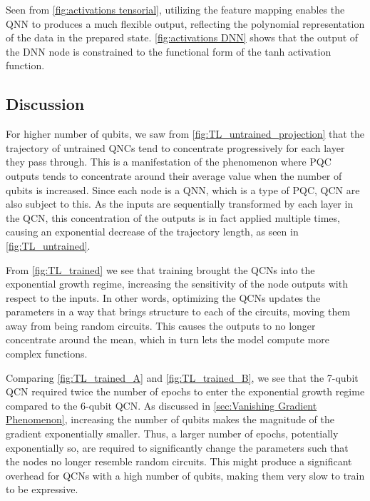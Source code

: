 Seen from \autoref{fig:activations tensorial}, utilizing the feature mapping enables the QNN to produces a much flexible output, reflecting the polynomial representation of the data in the prepared state. \autoref{fig:activations DNN} shows that the output of the DNN node is constrained to the functional form of the tanh activation function.   




\subsection{Discussion}\label{sec:Discussion Expressivity}

For higher number of qubits, we saw from \autoref{fig:TL_untrained_projection} that the trajectory of untrained QNCs tend to concentrate progressively for each layer they pass through. This is a manifestation of the phenomenon where PQC outputs tends to concentrate around their average value when the number of qubits is increased. Since each node is a QNN, which is a type of PQC, QCN are also subject to this. As the inputs are sequentially transformed by each layer in the QCN, this concentration of the outputs is in fact applied multiple times, causing an exponential decrease of the trajectory length, as seen in \autoref{fig:TL_untrained}.

From \autoref{fig:TL_trained} we see that training brought the QCNs into the exponential growth regime, increasing the sensitivity of the node outputs with respect to the inputs. In other words, optimizing the QCNs updates the parameters in a way that brings structure to each of the circuits, moving them away from being random circuits. This causes the outputs to no longer concentrate around the mean, which in turn lets the model compute more complex functions. 

Comparing \autoref{fig:TL_trained_A} and \autoref{fig:TL_trained_B}, we see that the 7-qubit QCN required twice the number of epochs to enter the exponential growth regime compared to the 6-qubit QCN. As discussed in \autoref{sec:Vanishing Gradient Phenomenon}, increasing the number of qubits makes the magnitude of the gradient exponentially smaller. Thus, a larger number of epochs, potentially exponentially so, are required to significantly change the parameters such that the nodes no longer resemble random circuits. This might produce a significant overhead for QCNs with a high number of qubits, making them very slow to train to be expressive.  

